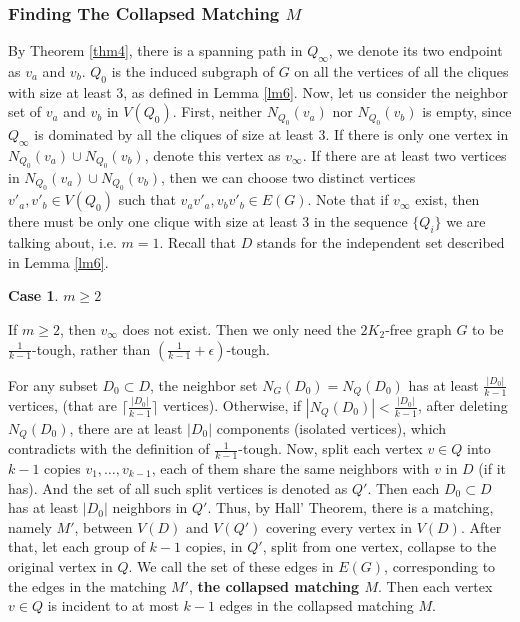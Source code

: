 \documentclass{amsart}
\theoremstyle{definition}
\newtheorem{case}{Case}
\begin{document}
\subsubsection{Finding The Collapsed Matching $M$}
By Theorem \ref{thm4}, there is a spanning path in $Q_{\infty}$, we denote its two endpoint as $v_a$ and $v_b$. $Q_0$ is the induced subgraph of $G$ on all the vertices of all the cliques with size at least 3, as defined in Lemma \ref{lm6}. Now, let us consider the neighbor set of $v_a$ and $v_b$ in $V(Q_0)$. First, neither $N_{Q_0}(v_a)$ nor $N_{Q_0}(v_b)$ is empty, since $Q_{\infty}$ is dominated by all the cliques of size at least 3. If there is only one vertex in $N_{Q_0}(v_a)\cup N_{Q_0}(v_b)$, denote this vertex as $v_{\infty}$. If there are at least two vertices in $N_{Q_0}(v_a)\cup N_{Q_0}(v_b)$, then we can choose two distinct vertices $v'_a,v'_b\in V(Q_0)$ such that $v_av'_a,v_bv'_b\in E(G)$. Note that if $v_{\infty}$ exist, then there must be only one clique with size at least 3 in the sequence $\{Q_i\}$ we are talking about, i.e. $m=1$.
Recall that $D$ stands for the independent set described in Lemma \ref{lm6}. 

\begin{case}$m\ge2$\end{case}
If $m\ge2$, then $v_{\infty}$ does not exist. Then we only need the $2K_2$-free graph $G$ to be $\frac{1}{k-1}$-tough, rather than $(\frac{1}{k-1}+\epsilon)$-tough.

For any subset $D_0\subset D$, the neighbor set $N_{G}(D_0)=N_Q(D_0)$ has at least $\frac{|D_0|}{k-1}$ vertices, (that are $\lceil\frac{|D_0|}{k-1}\rceil$ vertices). Otherwise, if $|N_Q(D_0)|<\frac{|D_0|}{k-1}$, after deleting $N_Q(D_0)$, there are at least $|D_0|$ components (isolated vertices), which contradicts with the definition of $\frac{1}{k-1}$-tough. 
Now, split each vertex $v\in Q$ into $k-1$ copies $v_1,\ldots,v_{k-1}$, each of them share the same neighbors with $v$ in $D$ (if it has). And the set of all such split vertices is denoted as $Q'$.  Then each $D_0\subset D$ has at least $|D_0|$ neighbors in $Q'$.
Thus, by Hall' Theorem, there is a matching, namely $M'$, between $V(D)$ and $V(Q')$ covering every vertex in $V(D)$. 
After that, let each group of $k-1$ copies, in $Q'$, split from one vertex, collapse to the original vertex in $Q$. We call the set of these edges in $E(G)$, corresponding to the edges in the matching $M'$, {\bf the collapsed matching $M$}. Then each vertex $v\in Q$ is incident to at most $k-1$ edges in the collapsed matching $M$. 
\end{document}
